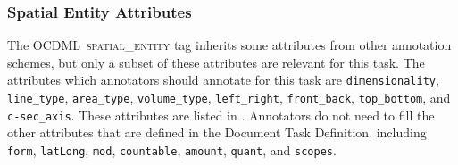\documentclass[11pt]{article}
\newcommand{\ML}{OCDML}
\newenvironment{note}
{\list{}
 {\setlength
  {\itemindent}
  {\listparindent}}
   \item[\textbf{Note:}]\relax}
{\endlist}
\begin{document}
\begin{note}
    
\end{note}


\subsubsection{Spatial Entity Attributes} %
\label{ssub:spatial_entity_attributes}

The \ML~\textsc{spatial\_entity} tag inherits some attributes from other annotation schemes, but only a subset of these attributes are relevant for this task. The attributes which annotators should annotate for this task are \texttt{dimensionality}, \texttt{line\_type}, \texttt{area\_type}, \texttt{volume\_type}, \texttt{left\_right}, \texttt{front\_back}, \texttt{top\_bottom}, and \texttt{c-sec\_axis}. These attributes are listed in . Annotators do not need to fill the other attributes that are defined in the Document Task Definition, including \texttt{form}, \texttt{latLong}, \texttt{mod}, \texttt{countable}, \texttt{amount}, \texttt{quant}, and \texttt{scopes}.
\end{document}

